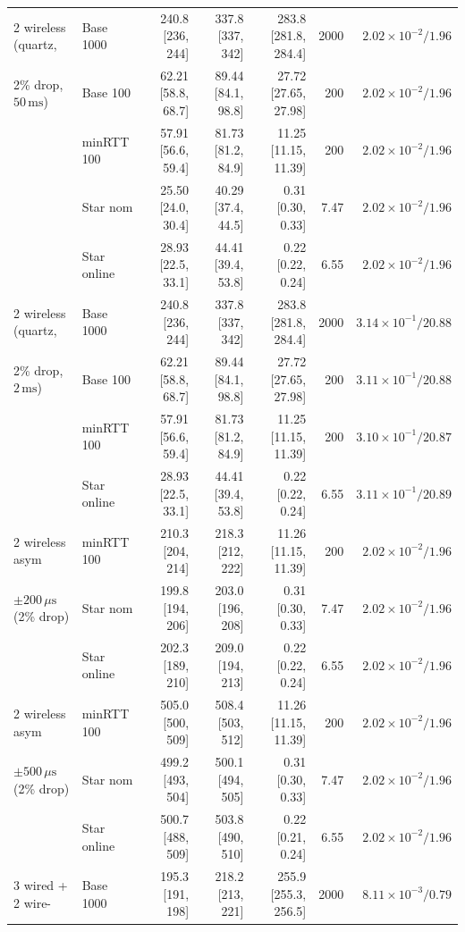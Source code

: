 \documentclass[11pt,a4paper]{article}
\theoremstyle{definition}
\begin{document}
\begin{table}[htb]
\begin{tabular}{@{}ll r r r r r@{}}
\midrule
2 wireless (quartz, & Base 1000 & 240.8 [236, 244] & 337.8 [337, 342] & 283.8 [281.8, 284.4] & 2000 & $2.02{\times}10^{-2} / 1.96$ \\
2\% drop, $50\,\text{ms}$) & Base 100 & 62.21 [58.8, 68.7] & 89.44 [84.1, 98.8] & 27.72 [27.65, 27.98] & 200 & $2.02{\times}10^{-2} / 1.96$ \\
 & minRTT 100 & 57.91 [56.6, 59.4] & 81.73 [81.2, 84.9] & 11.25 [11.15, 11.39] & 200 & $2.02{\times}10^{-2} / 1.96$ \\
 & Star nom & 25.50 [24.0, 30.4] & 40.29 [37.4, 44.5] & 0.31 [0.30, 0.33] & 7.47 & $2.02{\times}10^{-2} / 1.96$ \\
 & Star online & 28.93 [22.5, 33.1] & 44.41 [39.4, 53.8] & 0.22 [0.22, 0.24] & 6.55 & $2.02{\times}10^{-2} / 1.96$ \\
\midrule
2 wireless (quartz, & Base 1000 & 240.8 [236, 244] & 337.8 [337, 342] & 283.8 [281.8, 284.4] & 2000 & $3.14{\times}10^{-1} / 20.88$ \\
2\% drop, $2\,\text{ms}$) & Base 100 & 62.21 [58.8, 68.7] & 89.44 [84.1, 98.8] & 27.72 [27.65, 27.98] & 200 & $3.11{\times}10^{-1} / 20.88$ \\
 & minRTT 100 & 57.91 [56.6, 59.4] & 81.73 [81.2, 84.9] & 11.25 [11.15, 11.39] & 200 & $3.10{\times}10^{-1} / 20.87$ \\
 & Star online & 28.93 [22.5, 33.1] & 44.41 [39.4, 53.8] & 0.22 [0.22, 0.24] & 6.55 & $3.11{\times}10^{-1} / 20.89$ \\
\midrule
2 wireless asym & minRTT 100 & 210.3 [204, 214] & 218.3 [212, 222] & 11.26 [11.15, 11.39] & 200 & $2.02{\times}10^{-2} / 1.96$ \\
$\pm 200\,\mu\text{s}$ (2\% drop) & Star nom & 199.8 [194, 206] & 203.0 [196, 208] & 0.31 [0.30, 0.33] & 7.47 & $2.02{\times}10^{-2} / 1.96$ \\
 & Star online & 202.3 [189, 210] & 209.0 [194, 213] & 0.22 [0.22, 0.24] & 6.55 & $2.02{\times}10^{-2} / 1.96$ \\
\midrule
2 wireless asym & minRTT 100 & 505.0 [500, 509] & 508.4 [503, 512] & 11.26 [11.15, 11.39] & 200 & $2.02{\times}10^{-2} / 1.96$ \\
$\pm 500\,\mu\text{s}$ (2\% drop) & Star nom & 499.2 [493, 504] & 500.1 [494, 505] & 0.31 [0.30, 0.33] & 7.47 & $2.02{\times}10^{-2} / 1.96$ \\
 & Star online & 500.7 [488, 509] & 503.8 [490, 510] & 0.22 [0.21, 0.24] & 6.55 & $2.02{\times}10^{-2} / 1.96$ \\
\midrule
3 wired + 2 wire- & Base 1000 & 195.3 [191, 198] & 218.2 [213, 221] & 255.9 [255.3, 256.5] & 2000 & $8.11{\times}10^{-3} / 0.79$ \\

\end{tabular}
\end{table}
\end{document}
